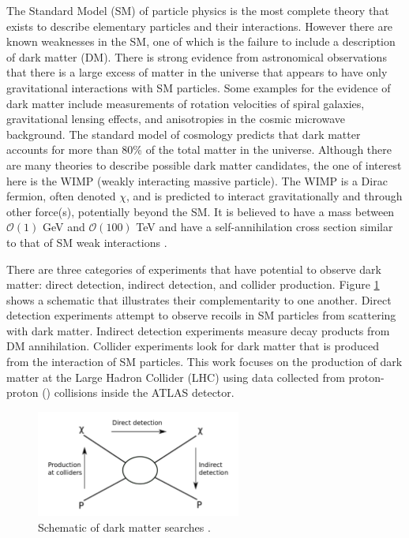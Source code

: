 \label{chapter:introduction}

The Standard Model (SM) of particle physics is the most complete theory that exists to describe elementary particles and their interactions. However there are known weaknesses in the SM, one of which is the failure to include a description of dark matter (DM). There is strong evidence from astronomical observations that there is a large excess of matter in the universe that appears to have only gravitational interactions with SM particles. Some examples for the evidence of dark matter include measurements of rotation velocities of spiral galaxies, gravitational lensing effects, and anisotropies in the cosmic microwave background. The standard model of cosmology predicts that dark matter accounts for more than 80\% of the total matter in the universe. Although there are many theories to describe possible dark matter candidates, the one of interest here is the WIMP (weakly interacting massive particle). The WIMP is a Dirac fermion, often denoted $\chi$, and is predicted to interact gravitationally and through other force(s), potentially beyond the SM. It is believed to have a mass between $\mathcal{O}(1)$ GeV and $\mathcal{O}(100)$ TeV and have a self-annihilation cross section similar to that of SM weak interactions \cite{Bertone:2017adx}.

There are three categories of experiments that have potential to observe dark matter: direct detection, indirect detection, and collider production. Figure \ref{fig:detection} shows a schematic that illustrates their complementarity to one another. Direct detection experiments attempt to observe recoils in SM particles from scattering with dark matter. Indirect detection experiments measure decay products from DM annihilation. Collider experiments look for dark matter that is produced from the interaction of SM particles. This work focuses on the production of dark matter at the Large Hadron Collider (LHC) using data collected from proton-proton (\pp) collisions inside the ATLAS detector.

\begin{figure}[htb]
\centering
\includegraphics[width=0.6\textwidth]{Figures/detection.png}
\caption{Schematic of dark matter searches \cite{Undagoitia:2015gya}.}
\label{fig:detection}
\end{figure}

